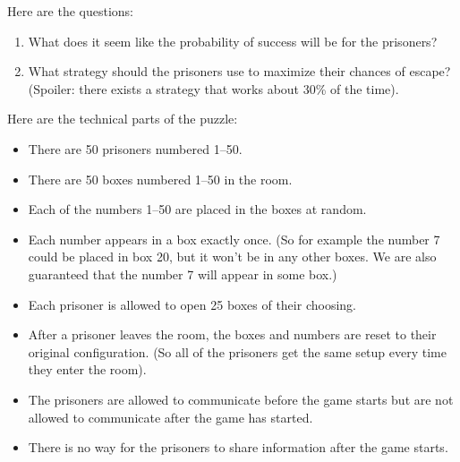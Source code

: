 \documentclass[]{article}
\newcommand{\taylor}[1]{{\color{blue} \sf $\spadesuit\spadesuit\spadesuit$ Taylor: [#1]}}
\numberwithin{equation}{section}
\theoremstyle{definition}
\theoremstyle{remark}
\begin{document}
\noindent Here are the questions:
\begin{enumerate}
\item What does it seem like the probability of success will be for the prisoners?
\item What strategy should the prisoners use to maximize their chances of escape? (Spoiler: there exists a strategy that works about 30\% of the time).
\end{enumerate}

\noindent Here are the technical parts of the puzzle:

\begin{itemize}
	\item There are 50 prisoners numbered 1--50.
	\item There are 50 boxes numbered 1--50 in the room.
	\item Each of the numbers 1--50 are placed in the boxes at random. 
	\item Each number appears in a box exactly once. (So for example the number 7 could be placed in box 20, but it won't be in any other boxes. We are also guaranteed that the number 7 will appear in some box.)
	\item Each prisoner is allowed to open 25 boxes of their choosing.
	\item After a prisoner leaves the room, the boxes and numbers are reset to their original configuration. (So all of the prisoners get the same setup every time they enter the room).
	\item The prisoners are allowed to communicate before the game starts but are not allowed to communicate after the game has started. 
	\item There is no way for the prisoners to share information after the game starts.
\end{itemize} 

%
%
\end{document}
